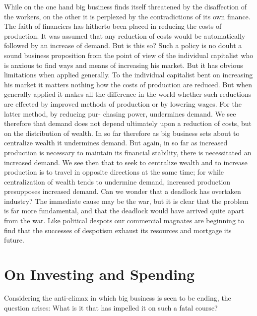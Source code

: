 \documentclass{book}
\begin{document}
While on the one hand big business finds itself threatened by the disaffection of the workers, on the other it is perplexed by the contradictions of its own finance. The faith of financiers has hitherto been placed in reducing the costs of production. It was assumed that any reduction of costs would be automatically followed by an increase of demand. But is this so? Such a policy is no doubt a sound business proposition from the point of view of the individual capitalist who is anxious to find ways and means of increasing his market. But it has obvious limitations when applied generally. To the individual capitalist bent on increasing his market it matters nothing how the costs of production are reduced. But when generally applied it makes all the difference in the world whether such reductions are effected by improved methods of production or by lowering wages. For the latter method, by reducing pur- chasing power, undermines demand. We see therefore that demand does not depend ultimately upon a reduction of costs, but on the distribution of wealth. In so far therefore as big business sets about to centralize wealth it undermines demand. But again, in so far as increased production is necessary to maintain its financial stability, there is necessitated an increased demand. We see then that to seek to centralize wealth and to increase production is to travel in opposite directions at the same time; for while centralization of wealth tends to undermine demand, increased production presupposes increased demand. Can we wonder that a deadlock has overtaken industry? The immediate cause may be the war, but it is clear that the problem is far more fundamental, and that the deadlock would have arrived quite apart from the war. Like political despots our commercial magnates are beginning to find that the successes of despotism exhaust its resources and mortgage its future.

\chapter{On Investing and Spending}
\label{chapter-4}
Considering the anti-climax in which big business is seen to be ending, the question arises: What is it that has impelled it on such a fatal course?
\end{document}
